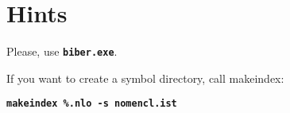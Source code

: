 %
%
%



\chapter{Hints}

Please, use  \textbf{\texttt{biber.exe}}.

\bigskip

If you want to create a symbol directory, call makeindex:


\textbf{\texttt{makeindex \%.nlo -s nomencl.ist}}

